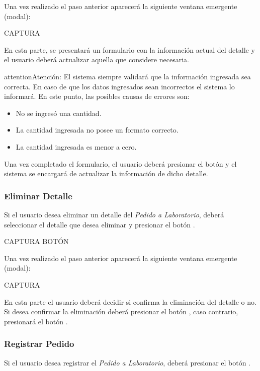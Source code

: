 \documentclass[a4paper,10pt,spanish]{sphinxmanual}
\begin{document}
Una vez realizado el paso anterior aparecerá la siguiente ventana emergente (modal):

CAPTURA

En esta parte, se presentará un formulario con la información actual del detalle y el usuario deberá actualizar aquella que considere necesaria.

\begin{notice}{attention}{Atención:}
El sistema siempre validará que la información ingresada sea correcta. En caso de que los datos ingresados sean incorrectos el sistema lo informará.
En este punto, las posibles causas de errores son:
\begin{itemize}
\item {} 
No se ingresó una cantidad.

\item {} 
La cantidad ingresada no posee un formato correcto.

\item {} 
La cantidad ingresada es menor a cero.

\end{itemize}
\end{notice}

Una vez completado el formulario, el usuario deberá presionar el botón  y el sistema se encargará de actualizar la información de dicho detalle.


\subsubsection{Eliminar Detalle}
\label{pedidosalab:eliminar-detalle}\label{pedidosalab:eliminar-detalle-pl}
Si el usuario desea eliminar un detalle del \emph{Pedido a Laboratorio}, deberá seleccionar el detalle que desea eliminar y presionar el botón .

CAPTURA BOTÓN

Una vez realizado el paso anterior aparecerá la siguiente ventana emergente (modal):

CAPTURA

En esta parte el usuario deberá decidir si confirma la eliminación del detalle o no. Si desea confirmar la eliminación deberá presionar el botón , caso contrario, presionará el botón .


\subsubsection{Registrar Pedido}
\label{pedidosalab:registrar-pedido-pl}\label{pedidosalab:registrar-pedido}
Si el usuario desea registrar el \emph{Pedido a Laboratorio}, deberá presionar el botón .
\end{document}
